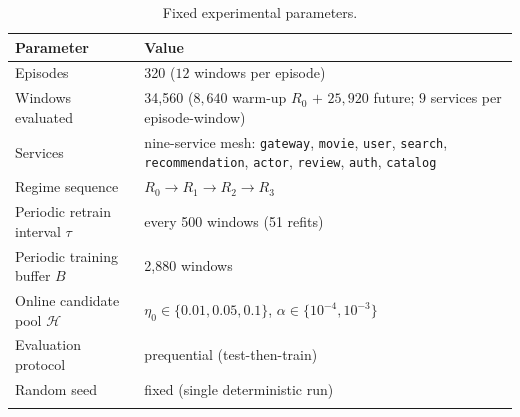 \documentclass[pdflatex,sn-mathphys-num]{sn-jnl}%
\theoremstyle{thmstyleone}%
\theoremstyle{thmstyletwo}%
\theoremstyle{thmstylethree}%
\begin{document}
\begin{appendices}
\begin{table}[ht]
\caption{Fixed experimental parameters.}\label{tab:appconst}
\begin{tabular}{@{}l p{}@{}}
\toprule
Parameter & Value \\
\midrule
Episodes                       & 320 ($12$ windows per episode) \\
Windows evaluated              & 34{,}560 ($8{,}640$ warm-up $R_0$ ${+}$ $25{,}920$ future; $9$ services per episode-window) \\
Services                       & nine-service mesh: \texttt{gateway}, \texttt{movie}, \texttt{user}, \texttt{search}, \texttt{recommendation}, \texttt{actor}, \texttt{review}, \texttt{auth}, \texttt{catalog} \\
Regime sequence                & $R_0 \rightarrow R_1 \rightarrow R_2 \rightarrow R_3$ \\
Periodic retrain interval $\tau$ & every 500 windows (51 refits) \\
Periodic training buffer $B$   & 2{,}880 windows \\
Online candidate pool $\mathcal{H}$ & $\eta_0 \in \{0.01,0.05,0.1\}$, $\alpha \in \{10^{-4},10^{-3}\}$ \\
Evaluation protocol            & prequential (test-then-train) \\
Random seed                    & fixed (single deterministic run) \\
\botrule
\end{tabular}
\end{table}
\FloatBarrier

\end{appendices}

%
\end{document}

